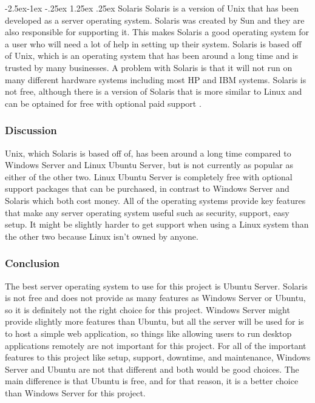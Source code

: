 \documentclass[onecolumn, draftclsnofoot,10pt, compsoc]{IEEEtran}
\makeatletter
\renewcommand\paragraph{\@startsection{paragraph}{4}{\z@}%
            {-2.5ex\@plus -1ex \@minus -.25ex}%
            {1.25ex \@plus .25ex}%
            {\normalfont\normalsize\bfseries}}
\makeatother
\begin{document}
\paragraph{Solaris}
Solaris is a version of Unix that has been developed as a server operating system. Solaris was created by Sun and they are also responsible for supporting it. This makes Solaris a good operating system for a user who will need a lot of help in setting up their system. Solaris is based off of Unix, which is an operating system that has been around a long time and is trusted by many businesses. A problem with Solaris is that it will not run on many different hardware systems including most HP and IBM systems. Solaris is not free, although there is a version of Solaris that is more similar to Linux and can be optained for free with optional paid support \cite{solaris}.

\subsubsection{Discussion}
Unix, which Solaris is based off of, has been around a long time compared to Windows Server and Linux Ubuntu Server, but is not currently as popular as either of the other two. Linux Ubuntu Server is completely free with optional support packages that can be purchased, in contrast to Windows Server and Solaris which both cost money. All of the operating systems provide key features that make any server operating system useful such as security, support, easy setup. It might be slightly harder to get support when using a Linux system than the other two because Linux isn't owned by anyone.

\subsubsection{Conclusion}
The best server operating system to use for this project is Ubuntu Server. Solaris is not free and does not provide as many features as Windows Server or Ubuntu, so it is definitely not the right choice for this project. Windows Server might provide slightly more features than Ubuntu, but all the server will be used for is to host a simple web application, so things like allowing users to run desktop applications remotely are not important for this project. For all of the important features to this project like setup, support, downtime, and maintenance, Windows Server and Ubuntu are not that different and both would be good choices. The main difference is that Ubuntu is free, and for that reason, it is a better choice than Windows Server for this project.
\end{document}
